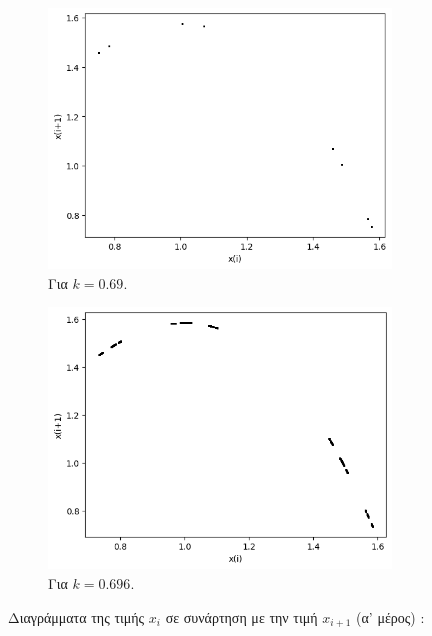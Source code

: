 \begin{figure}[h!]
\begin{subfigure}[b]{0.4\textwidth}
		\includegraphics[width=\textwidth]{LateX images/graphs q12/g7}
		\caption{Για $k=0.69$.}
		\label{f:k63}
	\end{subfigure}
	\hfill
	\begin{subfigure}[b]{0.4\textwidth}
		\centering
		\includegraphics[width=\textwidth]{LateX images/graphs q12/g8}
		\caption{Για $k=0.696$.}
		\label{f:k64}
	\end{subfigure}
	\hfill
	\caption{Διαγράμματα της τιμής \(x_i\) σε συνάρτηση με την τιμή \(x_{i+1}\) (α' μέρος) :}
\end{figure}
